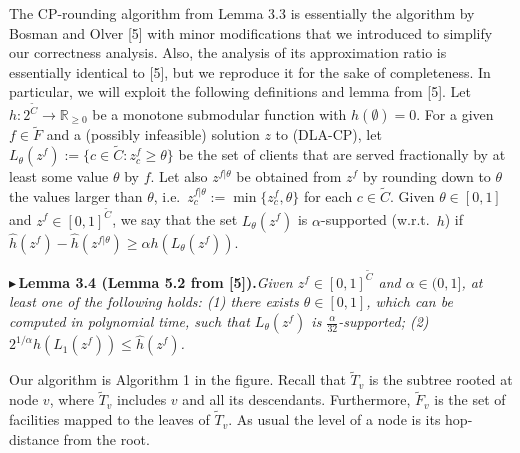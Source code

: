 \documentclass[11pt]{article}
\newcommand{\tF}{\tilde F}
\newcommand{\tC}{\tilde C}
\newcommand{\tT}{\tilde T}
\newcommand{\hatt}[1]{\hat{#1}}
\newcommand{\pitem}[2]{\par\medskip\noindent$\blacktriangleright$\,\textbf{#1}\;\textit{#2}\par\medskip}
\begin{document}
The CP-rounding algorithm from Lemma 3.3 is essentially the algorithm by Bosman and
Olver [5] with minor modifications that we introduced to simplify our correctness analysis.
Also, the analysis of its approximation ratio is essentially identical to [5], but we reproduce it
for the sake of completeness. In particular, we will exploit the following definitions and lemma
from [5]. Let $h:2^{\tC}\to\mathbb{R}_{\ge 0}$ be a monotone submodular function with $h(\emptyset)=0$. For a given
$f\in\tF$ and a (possibly infeasible) solution $z$ to (DLA-CP), let $L_\theta(z^f):=\{c\in\tC:z_c^f\ge\theta\}$ be
the set of clients that are served fractionally by at least some value $\theta$ by $f$. Let also $z^{f|\theta}$
be obtained from $z^f$ by rounding down to $\theta$ the values larger than $\theta$, i.e.\ $z_c^{f|\theta}:=\min\{z_c^f,\theta\}$
for each $c\in\tC$. Given $\theta\in[0,1]$ and $z^f\in[0,1]^{\tC}$, we say that the set $L_\theta(z^f)$ is $\alpha$-supported
(w.r.t.\ $h$) if $\hatt h(z^f)-\hatt h(z^{f|\theta})\ge\alpha h(L_\theta(z^f))$.

\pitem{Lemma 3.4 (Lemma 5.2 from [5]).}{Given $z^f\in[0,1]^{\tC}$ and $\alpha\in(0,1]$, at least one of the
following holds: (1) there exists $\theta\in[0,1]$, which can be computed in polynomial time, such
that $L_\theta(z^f)$ is $\frac{\alpha}{32}$-supported; (2) $2^{1/\alpha}h(L_1(z^f))\le\hatt h(z^f)$.}

Our algorithm is Algorithm 1 in the figure. Recall that $\tT_v$ is the subtree rooted at node $v$,
where $\tT_v$ includes $v$ and all its descendants. Furthermore, $\tF_v$ is the set of facilities mapped
to the leaves of $\tT_v$. As usual the level of a node is its hop-distance from the root.
\end{document}
